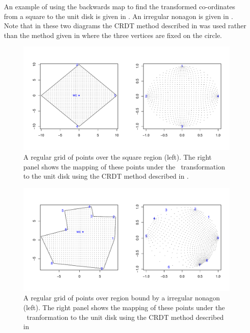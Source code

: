 An example of using the backwards map to find the transformed co-ordinates from a square to the unit disk is given in . An irregular nonagon is given in . Note that in these two diagrams the CRDT method described in  was used rather than the method given in  where the three vertices are fixed on the circle.


\begin{figure} [bp]
\centering
\includegraphics[scale=0.5]{sc/figs/squaredomain.pdf}
\caption{A regular grid of points over the square region (left). The right panel shows the mapping of these points under the \sch\ transformation to the unit disk using the CRDT method described in .}
\label{squaredomain}
\end{figure}

\begin{figure} [tbp]
\centering
\includegraphics[scale=0.5]{sc/figs/irregulardomain.pdf}
\caption{A regular grid of points over region bound by a irregular nonagon (left). The right panel shows the mapping of these points under the \sch\ tranformation to the unit disk using the CRDT method described in }
\label{irregdomain}
\end{figure}


